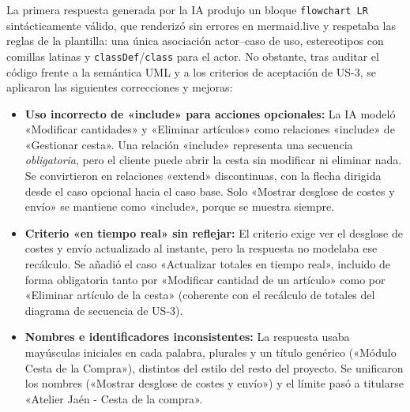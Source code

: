 La primera respuesta generada por la IA produjo un bloque \texttt{flowchart LR} sintácticamente válido, que renderizó sin errores en mermaid.live y respetaba las reglas de la plantilla: una única asociación actor--caso de uso, estereotipos con comillas latinas y \texttt{classDef}/\texttt{class} para el actor. No obstante, tras auditar el código frente a la semántica UML y a los criterios de aceptación de US-3, se aplicaron las siguientes correcciones y mejoras:
\begin{itemize}[leftmargin=*,nosep]
\item \textbf{Uso incorrecto de «include» para acciones opcionales:} La IA modeló «Modificar cantidades» y «Eliminar artículos» como relaciones «include» de «Gestionar cesta». Una relación «include» representa una secuencia \emph{obligatoria}, pero el cliente puede abrir la cesta sin modificar ni eliminar nada. Se convirtieron en relaciones «extend» discontinuas, con la flecha dirigida desde el caso opcional hacia el caso base. Solo «Mostrar desglose de costes y envío» se mantiene como «include», porque se muestra siempre.
\item \textbf{Criterio «en tiempo real» sin reflejar:} El criterio exige ver el desglose de costes y envío actualizado al instante, pero la respuesta no modelaba ese recálculo. Se añadió el caso «Actualizar totales en tiempo real», incluido de forma obligatoria tanto por «Modificar cantidad de un artículo» como por «Eliminar artículo de la cesta» (coherente con el recálculo de totales del diagrama de secuencia de US-3).
\item \textbf{Nombres e identificadores inconsistentes:} La respuesta usaba mayúsculas iniciales en cada palabra, plurales y un título genérico («Módulo Cesta de la Compra»), distintos del estilo del resto del proyecto. Se unificaron los nombres («Mostrar desglose de costes y envío») y el límite pasó a titularse «Atelier Jaén - Cesta de la compra».
\end{itemize}
